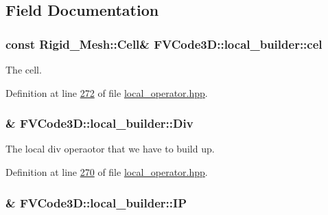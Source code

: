 \subsection{Field Documentation}
\subsubsection[{\texorpdfstring{cel}{cel}}]{\setlength{\rightskip}{0pt plus 5cm}const {\bf Rigid\+\_\+\+Mesh\+::\+Cell}\& F\+V\+Code3\+D\+::local\+\_\+builder\+::cel\hspace{0.3cm}{\ttfamily [private]}}\hypertarget{classFVCode3D_1_1local__builder_a4fe73771f0cce11419c866ab34ee8fd4}{}\label{classFVCode3D_1_1local__builder_a4fe73771f0cce11419c866ab34ee8fd4}


The cell. 



Definition at line \hyperlink{local__operator_8hpp_source_l00272}{272} of file \hyperlink{local__operator_8hpp_source}{local\+\_\+operator.\+hpp}.

\subsubsection[{\texorpdfstring{Div}{Div}}]{\& F\+V\+Code3\+D\+::local\+\_\+builder\+::\+Div\hspace{0.3cm}{\ttfamily [private]}}\hypertarget{classFVCode3D_1_1local__builder_a2ac4ebad7f42bb69cdd73fdf215b7e99}{}\label{classFVCode3D_1_1local__builder_a2ac4ebad7f42bb69cdd73fdf215b7e99}


The local div operaotor that we have to build up. 



Definition at line \hyperlink{local__operator_8hpp_source_l00270}{270} of file \hyperlink{local__operator_8hpp_source}{local\+\_\+operator.\+hpp}.

\subsubsection[{\texorpdfstring{IP}{IP}}]{\& F\+V\+Code3\+D\+::local\+\_\+builder\+::\+IP\hspace{0.3cm}{\ttfamily [private]}}\hypertarget{classFVCode3D_1_1local__builder_adc109a32e01c2f6acb673ee503c37446}{}\label{classFVCode3D_1_1local__builder_adc109a32e01c2f6acb673ee503c37446}


